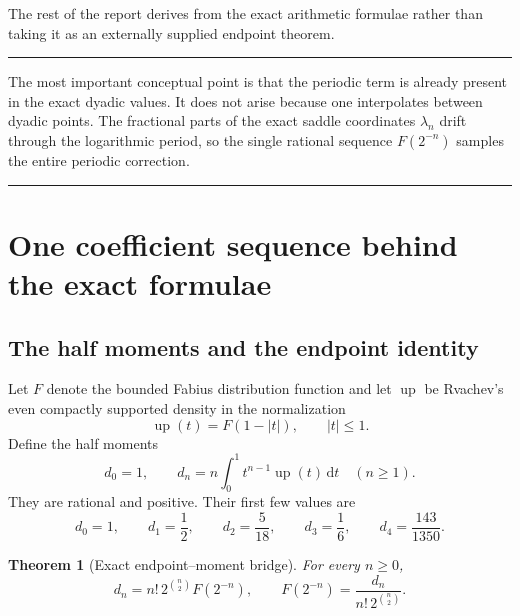 \documentclass[11pt,oneside]{article}
\newtheorem{theorem}{Theorem}[section]
\theoremstyle{definition}
\theoremstyle{remark}
\newcommand{\Up}{\operatorname{up}}
\newcommand{\dd}{\,\mathrm d}
\newenvironment{boxedremark}{%
  \par\smallskip\noindent\begin{center}\begin{minipage}{0.94\textwidth}%
  \color{black}\hrule\vspace{0.6em}\small
}{%
  \vspace{0.6em}\hrule\end{minipage}\end{center}\smallskip
}
\begin{document}
The rest of the report derives  from the exact arithmetic formulae rather
than taking it as an externally supplied endpoint theorem.

\begin{boxedremark}
The most important conceptual point is that the periodic term is already present in the exact
dyadic values.  It does not arise because one interpolates between dyadic points.  The
fractional parts of the exact saddle coordinates $\lambda_n$ drift through the logarithmic
period, so the single rational sequence $F(2^{-n})$ samples the entire periodic correction.
\end{boxedremark}

\section{One coefficient sequence behind the exact formulae}
\label{sec:exact-sequence}

\subsection{The half moments and the endpoint identity}

Let $F$ denote the bounded Fabius distribution function and let $\Up$ be Rvachev's even
compactly supported density in the normalization
\begin{equation}
 \Up(t)=F(1-|t|),\qquad |t|\le1.                             \label{eq:up-fold}
\end{equation}
Define the half moments
\begin{equation}
 d_0=1,
 \qquad
 d_n=n\int_0^1t^{n-1}\Up(t)\dd t\quad(n\ge1).               \label{eq:dn}
\end{equation}
They are rational and positive.  Their first few values are
\begin{equation}
 d_0=1,\qquad d_1=\frac12,\qquad d_2=\frac5{18},\qquad
 d_3=\frac16,\qquad d_4=\frac{143}{1350}.                  \label{eq:dn-first}
\end{equation}

\begin{theorem}[Exact endpoint--moment bridge]
\label{thm:endpoint-moment}
For every $n\ge0$,
\begin{equation}
 d_n=n!\,2^{\binom n2}F(2^{-n}),
 \qquad
 F(2^{-n})=\frac{d_n}{n!\,2^{\binom n2}}.                  \label{eq:endpoint-moment}
\end{equation}
\end{theorem}
\end{document}
